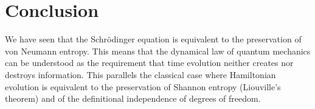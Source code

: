 \documentclass{techbrief}
\begin{document}
\section{Conclusion}

We have seen that the Schrödinger equation is equivalent to the preservation of von Neumann entropy. This means that the dynamical law of quantum mechanics can be understood as the requirement that time evolution neither creates nor destroys information. This parallels the classical case where Hamiltonian evolution is equivalent to the preservation of Shannon entropy (Liouville's theorem) and of the definitional independence of degrees of freedom.
\end{document}
